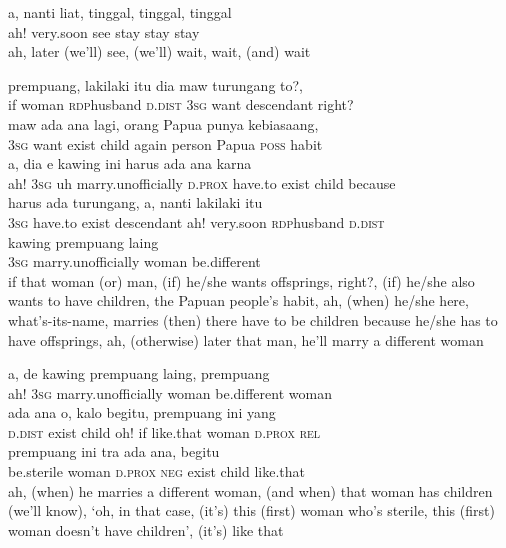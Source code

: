 \ea
\gll   a,   nanti   liat,   tinggal,   tinggal,   tinggal\\
  ah!   very.soon   see   stay   stay   stay\\
\glt
ah, later (we’ll) see, (we’ll) wait, wait, (and) wait
\z

\ea
{}    {prempuang,}    {laki{\Tilde}laki}    {itu}    {dia}    {maw}    {turungang}   to?,\\
   {if}    {woman}    {\textsc{rdp}{\Tilde}husband}    {\textsc{d.dist}}    {\textsc{3sg}}    {want}    {descendant}   right?\\
    {maw}    {ada}    {ana}    {lagi,}    {orang}    {Papua}    {punya}    {kebiasaang,}\\
   {\textsc{3sg}}    {want}    {exist}    {child}    {again}    {person}    {Papua}    {\textsc{poss}}    {habit}\\
\gll a,    {dia}    {e}    {kawing}    {ini}    {harus}    {ada}   ana    {karna}\\
  ah!    {\textsc{3sg}}    {uh}    {marry.unofficially}    {\textsc{d.prox}}    {have.to}    {exist}   child    {because}\\
    {harus}    {ada}    {turungang,}    {a,}    {nanti}    {laki{\Tilde}laki}    {itu}\\
   {\textsc{3sg}}    {have.to}    {exist}    {descendant}    {ah!}    {very.soon}    {\textsc{rdp}{\Tilde}husband}    {\textsc{d.dist}}\\
    {kawing}    {prempuang}    {laing}\\
   {\textsc{3sg}}    {marry.unofficially}    {woman}    {be.different}\\
\glt
if that woman (or) man, (if) he/she wants offsprings, right?, (if) he/she also wants to have children, the Papuan people’s habit, ah, (when) he/she here, what’s-its-name, marries (then) there have to be children because he/she has to have offsprings, ah, (otherwise) later that man, he’ll marry a different woman
\z

\ea
\gll   a,    {de}    {kawing}    {prempuang}    {laing,}    {prempuang}\\
  ah!    {\textsc{3sg}}    {marry.unofficially}    {woman}    {be.different}    {woman}\\
    {ada}   ana    {o,}    {kalo}    {begitu,}    {prempuang}    {ini}   yang\\
   {\textsc{d.dist}}    {exist}   child    {oh!}    {if}    {like.that}    {woman}    {\textsc{d.prox}}   \textsc{rel}\\
    {prempuang}    {ini}    {tra}    {ada}   ana,    {begitu}\\
   {be.sterile}    {woman}    {\textsc{d.prox}}    {\textsc{neg}}    {exist}   child    {like.that}\\
\glt
ah, (when) he marries a different woman, (and when) that woman has children (we’ll know), ‘oh, in that case, (it’s) this (first) woman who’s sterile, this (first) woman doesn’t have children’, (it’s) like that
\z

